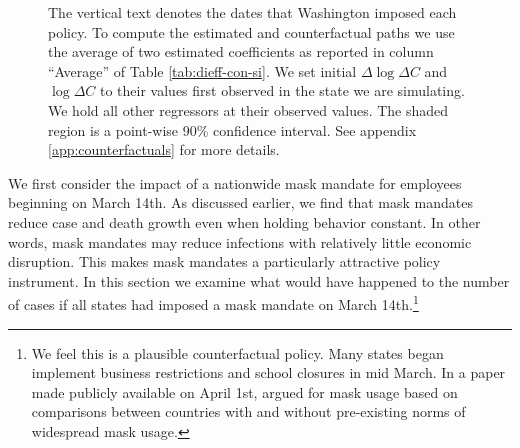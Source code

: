\documentclass[11pt,reqno,letter]{amsart}
\theoremstyle{definition}
\begin{document}
\begin{figure}[ht]
\begin{minipage}{\linewidth}
    \begin{flushleft}
      \footnotesize The vertical text denotes the dates that
      Washington imposed each policy.  To compute the estimated and
      counterfactual paths we use the average of two estimated
      coefficients as reported in column ``Average'' of Table
      \ref{tab:dieff-con-si}. We set initial $\Delta \log \Delta C$
      and $\log \Delta C$ to their values first observed in the state
      we are simulating. We hold all other regressors at their
      observed values. The shaded region is a point-wise 90\%
      confidence interval. See appendix \ref{app:counterfactuals} for
      more details.
    \end{flushleft}
  \end{minipage}
\end{figure}


We first consider the impact of a nationwide mask mandate for
employees beginning on March 14th. As discussed earlier, we find that
mask mandates reduce case and death growth even when holding behavior
constant. In other words, mask mandates may reduce infections with
relatively little economic disruption. This makes mask mandates a
particularly attractive policy instrument. In this section we examine
what would have happened to the number of cases if all states had
imposed a mask mandate on March 14th.\footnote{We feel this is a
  plausible counterfactual policy. Many states began implement
  business restrictions and school closures in mid March. In a paper
  made publicly available on April 1st, \cite{abaluck2020} argued for
  mask usage based on comparisons between countries with and without
  pre-existing norms of widespread mask usage.}
\end{document}
